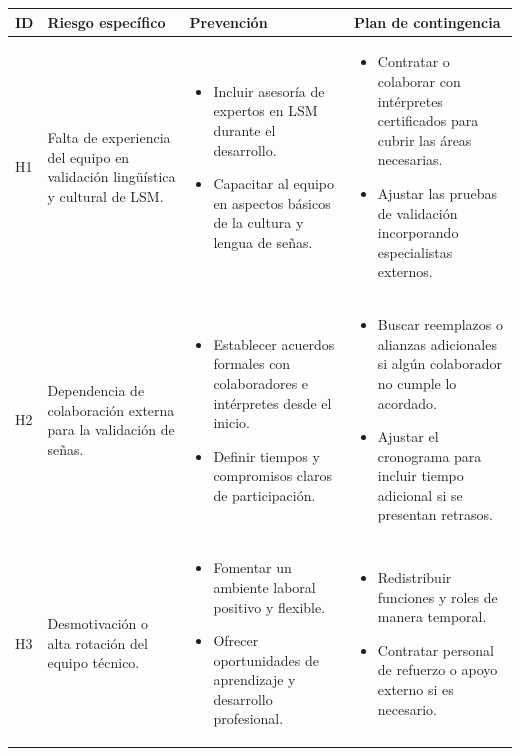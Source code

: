 \begin{longtable}{|>{\centering\arraybackslash}p{0.8cm}|>{\raggedright\arraybackslash}p{3.5cm}|>{\raggedright\arraybackslash}p{5.1cm}|>{\raggedright\arraybackslash}p{5.1cm}|}
	\hline
	\textbf{ID} & \textbf{Riesgo específico} & \textbf{Prevención} & \textbf{Plan de contingencia} \\
	\hline
	H1 & Falta de experiencia del equipo en validación lingüística y cultural de LSM. &
	\begin{itemize}
		\item Incluir asesoría de expertos en LSM durante el desarrollo.
		\item Capacitar al equipo en aspectos básicos de la cultura y lengua de señas.
	\end{itemize} &
	\begin{itemize}
		\item Contratar o colaborar con intérpretes certificados para cubrir las áreas necesarias.
		\item Ajustar las pruebas de validación incorporando especialistas externos.
	\end{itemize} \\
	\hline
	H2 & Dependencia de colaboración externa para la validación de señas. &
	\begin{itemize}
		\item Establecer acuerdos formales con colaboradores e intérpretes desde el inicio.
		\item Definir tiempos y compromisos claros de participación.
	\end{itemize} &
	\begin{itemize}
		\item Buscar reemplazos o alianzas adicionales si algún colaborador no cumple lo acordado.
		\item Ajustar el cronograma para incluir tiempo adicional si se presentan retrasos.
	\end{itemize} \\
	\hline
	H3 & Desmotivación o alta rotación del equipo técnico. &
	\begin{itemize}
		\item Fomentar un ambiente laboral positivo y flexible.
		\item Ofrecer oportunidades de aprendizaje y desarrollo profesional.
	\end{itemize} &
	\begin{itemize}
		\item Redistribuir funciones y roles de manera temporal.
		\item Contratar personal de refuerzo o apoyo externo si es necesario.

\end{itemize}
\end{longtable}
